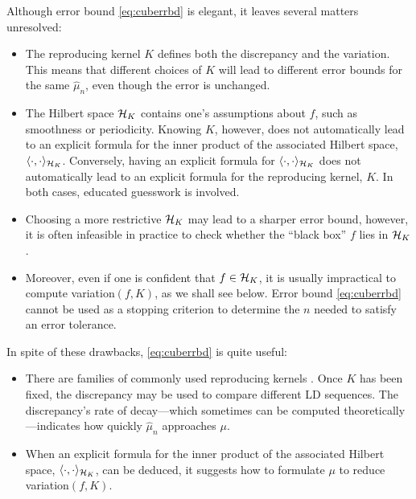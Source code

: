 \documentclass{svproc}
\begin{document}
Although error bound \eqref{eq:cuberrbd} is elegant, it leaves several matters unresolved:
\begin{itemize}
	\item The reproducing kernel $K$ defines both the discrepancy and the variation.  This means that different choices of $K$ will lead to different error bounds for the same $\hat{\mu}_n$, even though the error is unchanged.
	\item The Hilbert space ${\mathcal{H}}_K$ contains one's assumptions about $f$, such as smoothness or periodicity. Knowing $K$, however, does not automatically lead to an explicit formula for the inner product of the associated Hilbert space, $\langle \cdot, \cdot \rangle_{{\mathcal{H}}_K}$.  Conversely, having an explicit formula for  $\langle \cdot, \cdot \rangle_{{\mathcal{H}}_K}$ does not automatically lead to an explicit formula for the reproducing kernel, $K$.  In both cases, educated guesswork is involved.
	\item Choosing a more restrictive ${\mathcal{H}}_K$ may lead to a sharper error bound, however, it is often infeasible in practice to check whether the ``black box'' $f$ lies in ${\mathcal{H}}_K$.
	\item   Moreover, even if one is confident that $f \in {\mathcal{H}}_K$, it is usually impractical to compute variation$(f,K)$, as we shall see below.  Error bound \eqref{eq:cuberrbd} cannot be used as a stopping criterion to determine the $n$ needed to satisfy an error tolerance.
\end{itemize}
In spite of these drawbacks, \eqref{eq:cuberrbd} is quite useful:
\begin{itemize}
	\item There are families of commonly used reproducing kernels \cite{BerT-A04,Hic97a,Hic98b,Hic99b}. Once $K$ has been fixed, the discrepancy may be used to compare different LD sequences.  The discrepancy's rate of decay---which sometimes can be computed theoretically---indicates how quickly $\hat{\mu}_n$ approaches $\mu$.
	\item When an explicit formula for the inner product of the associated Hilbert space, $\langle \cdot, \cdot \rangle_{{\mathcal{H}}_K}$, can be deduced, it suggests how to formulate $\mu$ to reduce variation$(f,K)$.
\end{itemize}
\end{document}
